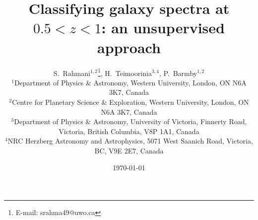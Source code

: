 \documentclass[useAMS,usenatbib]{mn2e}
\begin{document}

\title[Classifying high-$z$ galaxy spectra]{Classifying galaxy spectra at $0.5<z<1$: an unsupervised approach}
\date{\today}
\author[S.~Rahmani, H.~Teimoorinia and P.~Barmby]{S.~Rahmani$^{1,2}$\thanks{E-mail:
srahma49@uwo.ca}, H.~Teimoorinia$^{3,4}$, P.~Barmby$^{1,2}$\\
$^{1}$Department of Physics $\&$ Astronomy, Western University, London, ON N6A 3K7, Canada\\
$^{2}$Centre for Planetary Science \& Exploration, Western University, London, ON N6A 3K7, Canada\\
$^{3}$Department of Physics $\&$ Astronomy, University of Victoria, Finnerty Road, Victoria, British Columbia, V8P 1A1, Canada\\
$^{4}$NRC Herzberg Astronomy and Astrophysics, 5071 West Saanich Road, Victoria, BC, V9E 2E7, Canada }
\maketitle

\end{document}
